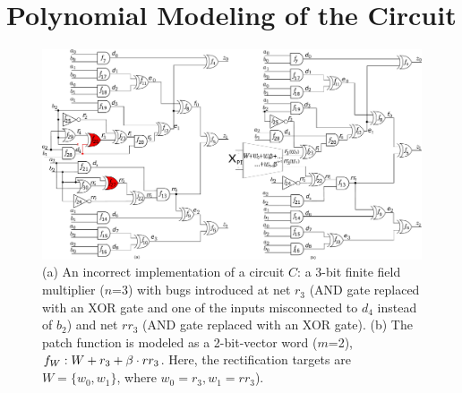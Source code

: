 \section{Polynomial Modeling of the Circuit}\label{sec:pmodel} 

\begin{figure}[hbt]
    \begin{center}
    \includegraphics[scale = 0.34]{mas_3_ddc_mfr.pdf}
    \end{center}
    \caption{  
    (a) An incorrect implementation of a circuit $C$: a 3-bit finite
        field multiplier ($n$=3) with bugs introduced at net $r_3$
        (AND gate replaced with an XOR gate and one of the inputs
        misconnected to $d_4$ instead of $b_2$) and net $rr_3$ (AND 
        gate replaced with an XOR gate). (b) The patch function is modeled as a
        2-bit-vector word ($m$=2), $f_W: W+r_3+\beta \cdot rr_3$.
        Here, the rectification targets are $W=\{w_0,w_1\}$, where
        $w_0=r_3, w_1=rr_3$).}  
    \label{fig:mas_bug_W}
\end{figure}



